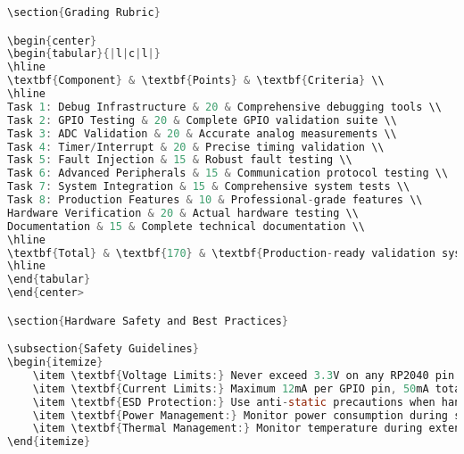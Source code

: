 \documentclass[11pt,a4paper]{article}
\begin{document}
\begin{lstlisting}[language=C]
\section{Grading Rubric}

\begin{center}
\begin{tabular}{|l|c|l|}
\hline
\textbf{Component} & \textbf{Points} & \textbf{Criteria} \\
\hline
Task 1: Debug Infrastructure & 20 & Comprehensive debugging tools \\
Task 2: GPIO Testing & 20 & Complete GPIO validation suite \\
Task 3: ADC Validation & 20 & Accurate analog measurements \\
Task 4: Timer/Interrupt & 20 & Precise timing validation \\
Task 5: Fault Injection & 15 & Robust fault testing \\
Task 6: Advanced Peripherals & 15 & Communication protocol testing \\
Task 7: System Integration & 15 & Comprehensive system tests \\
Task 8: Production Features & 10 & Professional-grade features \\
Hardware Verification & 20 & Actual hardware testing \\
Documentation & 15 & Complete technical documentation \\
\hline
\textbf{Total} & \textbf{170} & \textbf{Production-ready validation system} \\
\hline
\end{tabular}
\end{center>

\section{Hardware Safety and Best Practices}

\subsection{Safety Guidelines}
\begin{itemize}
    \item \textbf{Voltage Limits:} Never exceed 3.3V on any RP2040 pin
    \item \textbf{Current Limits:} Maximum 12mA per GPIO pin, 50mA total
    \item \textbf{ESD Protection:} Use anti-static precautions when handling hardware
    \item \textbf{Power Management:} Monitor power consumption during stress tests
    \item \textbf{Thermal Management:} Monitor temperature during extended testing
\end{itemize}


\end{lstlisting}
\end{document}

